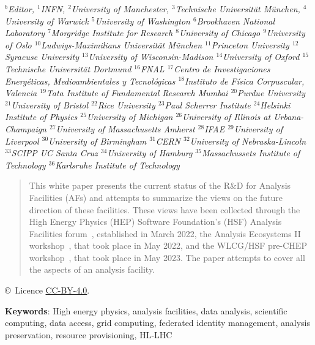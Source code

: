 \documentclass{article}
\begin{document}
\begin{titlepage}
\begin{center}
\bigskip
{\it\footnotesize
$^b$Editor,
$^1$INFN,
$^2$University of Manchester,
$^3$Technische Universität München,
$^4$University of Warwick
$^5$University of Washington
$^6$Brookhaven National Laboratory
$^{7}$Morgridge Institute for Research
$^{8}$University of Chicago
$^{9}$University of Oslo
$^{10}$Ludwigs-Maximilians Universität München
$^{11}$Princeton University
$^{12}$Syracuse University
$^{13}$University of Wisconsin-Madison
$^{14}$University of Oxford
$^{15}$Technische Universität Dortmund
$^{16}$FNAL
$^{17}$Centro de Investigaciones Energéticas, Medioambientales y Tecnológicas
$^{18}$Instituto de Física Corpuscular, Valencia
$^{19}$Tata Institute of Fundamental Research Mumbai
$^{20}$Purdue University
$^{21}$University of Bristol
$^{22}$Rice University
$^{23}$Paul Scherrer Institute
$^{24}$Helsinki Institute of Physics
$^{25}$University of Michigan
$^{26}$University of Illinois at Urbana-Champaign
$^{27}$University of Massachusetts Amherst
$^{28}$IFAE
$^{29}$University of Liverpool
$^{30}$University of Birmingham
$^{31}$CERN
$^{32}$University of Nebraska-Lincoln
$^{33}$SCIPP UC Santa Cruz
$^{34}$University of Hamburg
$^{35}$Massachussets Institute of Technology
$^{36}$Karlsruhe Institute of Technology
}
\end{center}

\vspace*{1.0cm}

\begin{abstract}
  \noindent

This white paper presents the current status of the R\&D for Analysis Facilities (AFs) and attempts to summarize the views on the future direction of these facilities. These views have been collected through the High Energy Physics (HEP) Software Foundation’s (HSF) Analysis Facilities forum~\cite{hsfaff}, established in March 2022, the Analysis Ecosystems II workshop~\cite{ecosystemstwo}, that took place in May 2022, and the WLCG/HSF pre-CHEP workshop~\cite{prechep}, that took place in May 2023. The paper attempts to cover all the aspects of an analysis facility.



\end{abstract}


\vspace{\fill}

{\footnotesize
\centerline{\copyright~Licence \href{http://creativecommons.org/licenses/by/4.0/}{CC-BY-4.0}.}}
\vspace*{2mm}

\vskip 0.5cm
\textbf{Keywords}: High energy physics, analysis facilities, data analysis, scientific computing, data access, grid computing, federated identity management, analysis preservation, resource provisioning, HL-LHC

\end{titlepage}
\end{document}

